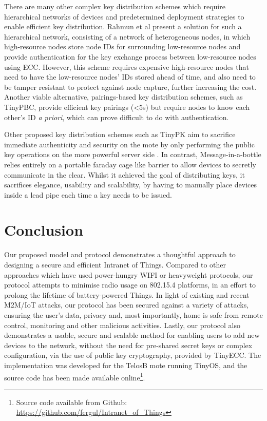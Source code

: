 \documentclass[conference]{./sty/IEEEtran}
\begin{document}
There are many other complex key distribution schemes which require hierarchical networks of devices \cite{MizanurRahman2010858,Shi2013235} and predetermined deployment strategies to enable efficient key distribution. Rahmun et al present a solution for such a hierarchical network\cite{MizanurRahman2010858}, consisting of a network of heterogeneous nodes, in which high-resource nodes store node IDs for surrounding low-resource nodes and provide authentication for the key exchange process between low-resource nodes using ECC. However, this scheme requires expensive high-resource nodes that need to have the low-resource nodes' IDs stored ahead of time, and also need to be tamper resistant to protect against node capture, further increasing the cost. Another viable alternative, pairings-based key distribution schemes, such as TinyPBC\cite{TinyPBC}, provide efficient key pairings (\textless5s) but require nodes to know each other's ID \textit{a priori}, which can prove difficult to do with authentication. 

Other proposed key distribution schemes such as TinyPK aim to sacrifice immediate authenticity and security on the mote by only performing the public key operations on the more powerful server side \cite{TinyPK}. In contrast, Message-in-a-bottle \cite{MessageBottle} relies entirely on a portable faraday cage like barrier to allow devices to secretly communicate in the clear. Whilst it achieved the goal of distributing keys, it sacrifices elegance, usability and scalability, by having to manually place devices inside a lead pipe each time a key needs to be issued.

\section{Conclusion}
\label{sec:conclusion}
Our proposed model and protocol demonstrates a thoughtful approach to designing a secure and efficient Intranet of Things. Compared to other approaches which have used power-hungry WIFI or heavyweight protocols, our protocol attempts to minimise radio usage on 802.15.4 platforms, in an effort to prolong the lifetime of battery-powered Things. In light of existing and recent M2M/IoT attacks, our protocol has been secured against a variety of attacks, ensuring the user's data, privacy and, most importantly, home is safe from remote control, monitoring and other malicious activities. Lastly, our protocol also demonstrates a usable, secure and scalable method for enabling users to add new devices to the network, without the need for pre-shared secret keys or complex configuration, via the use of public key cryptography, provided by TinyECC. The implementation was developed for the TelosB mote running TinyOS, and the source code has been made available online\footnote{Source code available from Github: \url{https://github.com/fergul/Intranet_of_Things}}.
\end{document}
